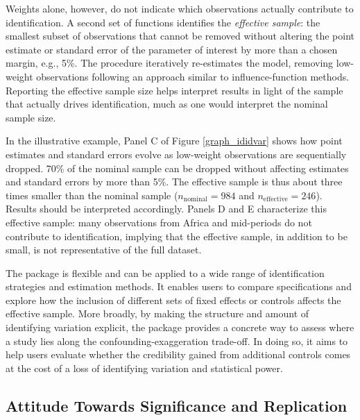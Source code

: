 \documentclass[usletter, 12pt]{article}
\begin{document}
				Weights alone, however, do not indicate which observations actually contribute to identification. A second set of functions identifies the \textit{effective sample}: the smallest subset of observations that cannot be removed without altering the point estimate or standard error of the parameter of interest by more than a chosen margin, e.g., 5\%.  The procedure iteratively re-estimates the model, removing low-weight observations following an approach similar to influence-function methods. Reporting the effective sample size helps interpret results in light of the sample that actually drives identification, much as one would interpret the nominal sample size. %
				
				In the illustrative example, Panel C of Figure \ref{graph_ididvar} shows how point estimates and standard errors evolve as low-weight observations are sequentially dropped. 70\% of the nominal sample can be dropped without affecting estimates and standard errors by more than 5\%. The effective sample is thus about three times smaller than the nominal sample ($n_{\text{nominal}} = 984$ and $n_{\text{effective}} = 246$). Results should be interpreted accordingly. Panels D and E characterize this effective sample: many observations from Africa and mid-periods do not contribute to identification, implying that the effective sample, in addition to be small, is not representative of the full dataset.
				
				The package is flexible and can be applied to a wide range of identification strategies and estimation methods. It enables users to compare specifications and explore how the inclusion of different sets of fixed effects or controls affects the effective sample. More broadly, by making the structure and amount of identifying variation explicit, the package provides a concrete way to assess where a study lies along the confounding-exaggeration trade-off. In doing so, it aims to help users evaluate whether the credibility gained from additional controls comes at the cost of a loss of identifying variation and statistical power.
				
			
				
		\subsection{Attitude Towards Significance and Replication}
	
\end{document}
